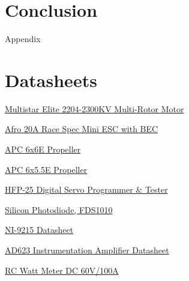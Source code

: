 \documentclass{article}
\begin{document}
\section{Conclusion}


\newpage
\thispagestyle{empty}  %
\begin{center}
	\vspace*{\fill}
	{\Huge Appendix}
	\vspace*{\fill}
\end{center}

\newpage
\begin{appendices}
\pagestyle{fancy}
\renewcommand{\thefigure}{A\arabic{figure}}
\setcounter{figure}{0}

\pagebreak

\hypertarget{datasheets}{}
\section{Datasheets}
\begin{enumerate}[label = {[\arabic*]}]
\small
\item \hypertarget{1}{\href{https://hobbyking.com/en_us/multistar-elite-2204-2300kv-multi-rotor-motor-cw-prop-adapter.html}{Multistar Elite 2204-2300KV Multi-Rotor Motor}}
\item \hypertarget{2}{\href{https://hobbyking.com/en_us/afro-20a-race-spec-mini-esc-with-bec.html}{ Afro 20A Race Spec Mini ESC with BEC}}
\item \hypertarget{3}{\href{https://www.apcprop.com/product/6x6e/}{APC 6x6E Propeller}}
\item \hypertarget{4}{\href{https://www.apcprop.com/product/6x5-5e/}{APC 6x5.5E Propeller}}
\item \hypertarget{5}{\href{https://hitecrcd.com/products/servos/discontinued-servos-servo-accessories/discontinued-programmers/hfp-25-digital-servo-programmer-tester-2/product}{HFP-25 Digital Servo Programmer \& Tester}}
\item \hypertarget{6}{\href{https://www.thorlabs.com/drawings/e7e91d1f442ec5dc-834C7101-FD1F-1B62-609D921F0FC0E314/FDS1010-SpecSheet.pdf}{Silicon Photodiode, FDS1010}}
\item \hypertarget{7}{\href{https://www.amc-systeme.de/files/pdf/ni-9215-amc.pdf}{NI-9215 Datasheet}}
\item \hypertarget{8}{\href{https://www.analog.com/media/en/technical-documentation/data-sheets/ad623.pdf}{AD623 Instrumentation Amplifier Datasheet}}
\item \hypertarget{9}{\href{https://www.amazon.com/Analyzer-Digital-Balance-Battery-Voltage/dp/B0753DPC2D/ref=asc_df_B0753DPC2D/?tag=hyprod-20&linkCode=df0&hvadid=309806250188&hvpos=&hvnetw=g&hvrand=1339579772044864897&hvpone=&hvptwo=&hvqmt=&hvdev=c&hvdvcmdl=&hvlocint=&hvlocphy=9028280&hvtargid=pla-567839154382&psc=1&mcid=0273f08627a23b188506d62979b40559&gclid=CjwKCAjw57exBhAsEiwAaIxaZg9oUrMDzZ3wh-Y_MJXKuUsgDDHnvtvx1OtjC213FpZroDuJ3cO4sBoCM-YQAvD_BwE}{RC Watt Meter DC 60V/100A }}
\end{enumerate}

\end{appendices}
\end{document}
